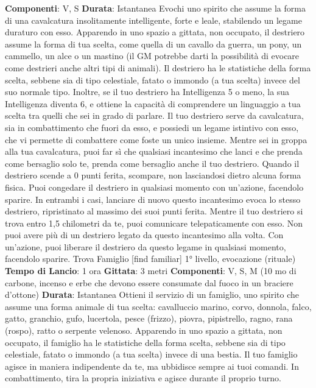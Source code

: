\begin{multicols}{2}
\textbf{Componenti}: V, S
\textbf{Durata}: Istantanea
Evochi uno spirito che assume la forma di una
cavalcatura insolitamente intelligente, forte e leale,
stabilendo un legame duraturo con esso. Apparendo in
uno spazio a gittata, non occupato, il destriero assume
la forma di tua scelta, come quella di un cavallo da
guerra, un pony, un cammello, un alce o un mastino (il
GM potrebbe darti la possibilità di evocare come
destrieri anche altri tipi di animali). Il destriero ha le
statistiche della forma scelta, sebbene sia di tipo
celestiale, fatato o immondo (a tua scelta) invece del
suo normale tipo. Inoltre, se il tuo destriero ha
Intelligenza 5 o meno, la sua Intelligenza diventa 6, e
ottiene la capacità di comprendere un linguaggio a tua
scelta tra quelli che sei in grado di parlare.
Il tuo destriero serve da cavalcatura, sia in
combattimento che fuori da esso, e possiedi un legame
istintivo con esso, che vi permette di combattere come
foste un unico insieme. Mentre sei in groppa alla tua
cavalcatura, puoi far sì che qualsiasi incantesimo che
lanci e che prenda come bersaglio solo te, prenda
come bersaglio anche il tuo destriero.
Quando il destriero scende a 0 punti ferita, scompare,
non lasciandosi dietro alcuna forma fisica. Puoi
congedare il destriero in qualsiasi momento con
un’azione, facendolo sparire. In entrambi i casi, lanciare
di nuovo questo incantesimo evoca lo stesso destriero,
ripristinato al massimo dei suoi punti ferita.
Mentre il tuo destriero si trova entro 1,5 chilometri da te,
puoi comunicare telepaticamente con esso.
Non puoi avere più di un destriero legato da questo
incantesimo alla volta. Con un’azione, puoi liberare il
destriero da questo legame in qualsiasi momento,
facendolo sparire.
Trova Famiglio
[find familiar]
1° livello, evocazione (rituale)
\textbf{Tempo di Lancio}: 1 ora
\textbf{Gittata}: 3 metri
\textbf{Componenti}: V, S, M (10 mo di carbone, incenso e
erbe che devono essere consumate dal fuoco in un
braciere d’ottone)
\textbf{Durata}: Istantanea
Ottieni il servizio di un famiglio, uno spirito che assume
una forma animale di tua scelta: cavalluccio marino,
corvo, donnola, falco, gatto, granchio, gufo, lucertola,
pesce (frizzo), piovra, pipistrello, ragno, rana (rospo),
ratto o serpente velenoso. Apparendo in uno spazio a
gittata, non occupato, il famiglio ha le statistiche della
forma scelta, sebbene sia di tipo celestiale, fatato o
immondo (a tua scelta) invece di una bestia.
Il tuo famiglio agisce in maniera indipendente da te, ma
ubbidisce sempre ai tuoi comandi. In combattimento,
tira la propria iniziativa e agisce durante il proprio turno.

\end{multicols}
